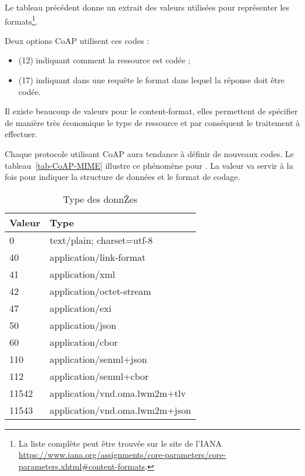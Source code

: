 Le tableau précédent donne un extrait des valeurs utilisées pour représenter les formats\footnote{La liste complète peut être trouvée sur le site de l'IANA \url{https://www.iana.org/assignments/core-parameters/core-parameters.xhtml\#content-formats}.}.

         \vspace{1em}

Deux options CoAP utilisent ces codes :
\begin{itemize}
    \item {} (12) indiquant comment la ressource est codée ;
    \item {} (17) indiquant dans une requête le format dans lequel la réponse doit être codée.
\end{itemize}
         \vspace{1em}

Il existe beaucoup de valeurs pour le content-format, elles permettent de spécifier de manière très économique le type de ressource et par conséquent le traitement à effectuer.

Chaque protocole utilisant CoAP aura tendance à définir de nouveaux codes. Le tableau~\vref{tab-CoAP-MIME} illustre ce phénomène pour . La valeur va servir à la fois pour indiquer la structure de données et le format de codage.
      
\begin{table}[!ht] 
\centering 
{
\begin{tabular}{|l|p{6cm}|}
\hline
 \rowcolor{purple!10} \textbf{Valeur} & \textbf{Type} \\\hline\hline
0 & text/plain; charset=utf-8  \\\hline		
40 & application/link-format  \\\hline	
41 & application/xml 		 \\\hline	
42 &application/octet-stream  \\\hline		
47 &application/exi 		 \\\hline
50 & application/json\index{JSON} 		 \\\hline
60 & application/cbor\index{CBOR} 		 \\\hline	
110 & application/senml+json\index{SenML}\\ \hline	
112 & application/senml+cbor \\ \hline
11542 & application/vnd.oma.lwm2m+tlv\index{TLV}\index{LwM2M}\index{OMA}  \\ \hline
11543 & application/vnd.oma.lwm2m+json  \\ \hline
\end{tabular}
}	
\caption{Type des donnŽes} 
\label{tab-CoAP-MIME} 
\end{table} 

